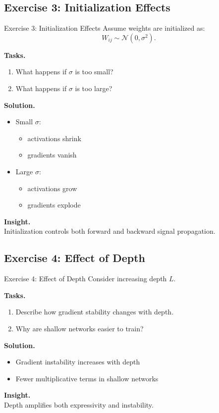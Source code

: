 \documentclass[aspectratio=169,11pt]{beamer}
\begin{document}
\subsection{Exercise 3: Initialization Effects}
\begin{frame}[t,allowframebreaks]{Exercise 3: Initialization Effects}
\small
Assume weights are initialized as:
\[
W_{ij} \sim \mathcal{N}(0, \sigma^2).
\]

\textbf{Tasks.}\\ \begin{enumerate}
    \item What happens if $\sigma$ is too small?
    \item What happens if $\sigma$ is too large?
\end{enumerate}

\textbf{Solution.}\\ \begin{itemize}
    \item Small $\sigma$:
    \begin{itemize}
        \item activations shrink
        \item gradients vanish
    \end{itemize}

    \item Large $\sigma$:
    \begin{itemize}
        \item activations grow
        \item gradients explode
    \end{itemize}
\end{itemize}

\textbf{Insight.}\\ Initialization controls both forward and backward signal propagation.
\end{frame}

\subsection{Exercise 4: Effect of Depth}
\begin{frame}[t,allowframebreaks]{Exercise 4: Effect of Depth}
\small
Consider increasing depth $L$.

\textbf{Tasks.}\\ \begin{enumerate}
    \item Describe how gradient stability changes with depth.
    \item Why are shallow networks easier to train?
\end{enumerate}

\textbf{Solution.}\\ \begin{itemize}
    \item Gradient instability increases with depth
    \item Fewer multiplicative terms in shallow networks
\end{itemize}

\textbf{Insight.}\\ Depth amplifies both expressivity and instability.
\end{frame}
\end{document}
